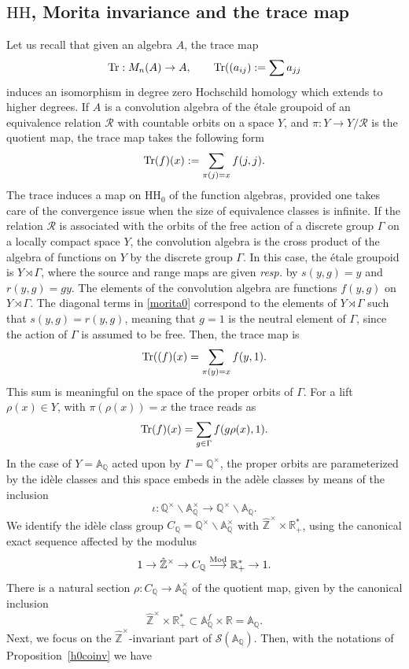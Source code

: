 \documentclass{pspum-l}
\theoremstyle{definition}
\theoremstyle{remark}
\numberwithin{equation}{section}
\def\A{{\mathbb A}}
\def\Q{{\mathbb Q}}
\def\R{{\mathbb R}}
\def\Z{{\mathbb Z}}
\def\cR{{\mathcal R}}
\def\cS{{\mathcal S}}
\def\tr{{\rm Tr}}
\def\Mod{{\rm Mod}}
\def\hatz{{\hat\Z^\times}}
\def\HH{\text{HH}}
\begin{document}
\subsection{$\HH$, Morita invariance and the trace map} Let us recall that given an algebra $A$, the trace map 
\[
\tr : M_n(A)\to A, \qquad \tr((a_{ij}):=\sum a_{jj}
\]
induces an isomorphism in degree zero Hochschild homology %
which extends to higher degrees. If $A$ is a convolution algebra of the \'etale groupoid of an equivalence relation $\cR$ with countable orbits on a space $Y$, and  $\pi:Y\to Y/\cR$ is the quotient map, the trace map takes the following form 
 \begin{equation}\label{morita0}
\tr(f)(x):=\sum_{\pi(j)=x} f(j,j).
\end{equation}
The trace induces a map on $\HH_0$ of the function algebras, provided one takes care of the convergence issue when the size of equivalence classes is infinite. If the relation $\cR$  is associated with the orbits of the free  action of a discrete  group $\Gamma$ on  a locally compact space $Y$, the convolution algebra is the cross product of the algebra of functions on $Y$ by the discrete  group $\Gamma$. In this case, the \'etale groupoid is $Y\rtimes \Gamma$, where the source and range maps are given {\it resp.} by $s(y,g)=y$ and $r(y,g)=gy$. The elements of the convolution algebra are functions $f(y,g)$ on $Y\rtimes \Gamma$. The diagonal terms  in \eqref{morita0} correspond to the elements of $Y\rtimes \Gamma$ such that $s(y,g)=r(y,g)$, meaning that $g=1$ is the neutral element of $\Gamma$, since the action of $\Gamma$ is assumed to be free. Then, the trace map  is
 \begin{equation*}\label{morita}
\tr((f)(x)=\sum_{\pi(y)=x} f(y,1).
\end{equation*}
This sum is meaningful on the space of the proper orbits of $\Gamma$. For a lift $\rho(x)\in Y$, with $\pi(\rho(x))=x$ the trace reads as \begin{equation}\label{morita1}
\tr(f)(x)=\sum_{g\in \Gamma} f(g\rho(x),1).
\end{equation}
In the case of    $Y=\A_\Q$   acted upon by $\Gamma=\Q^\times$, the  proper orbits are parameterized by the id\`ele classes and this space embeds in the ad\`ele classes by means of the inclusion \[
\iota : \Q^\times\backslash \A^\times_\Q\to \Q^\times\backslash \A_\Q.
\]
We identify the id\`ele class group $C_\Q=\Q^\times\backslash \A^\times_\Q$  with  $\hatz\times \R_+^*$, using the canonical exact sequence affected by the modulus
\[
1\to \hatz\to C_\Q \stackrel{\Mod}{\longrightarrow} \R_+^*\to 1.
\]
There is a natural section $\rho:C_\Q\to \A^\times_\Q$ of the quotient map,  given by the canonical inclusion 
\[
\hatz\times \R_+^*\subset \A_\Q^f\times \R =\A_\Q.
\]
Next, we focus on the $\hatz$-invariant part  of $\cS(\A_\Q)$. Then, with the notations of Proposition~\ref{h0coinv} we have
\end{document}
